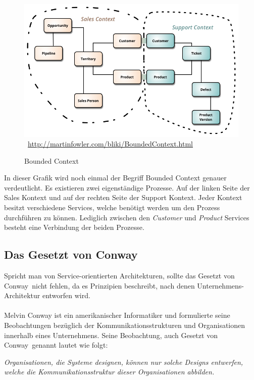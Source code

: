 \begin{figure}[htb]
    \centering 
    \includegraphics[width=\linewidth]{content/images/BoundedContext}\
    \quelle\url{http://martinfowler.com/bliki/BoundedContext.html}
    \caption[Bounded Context]{Bounded Context\\}
    \label{fig:BoundedContext}  
\end{figure} 
In dieser Grafik wird noch einmal der Begriff Bounded Context genauer verdeutlicht. Es existieren zwei eigenständige Prozesse. Auf der linken Seite der Sales Kontext und auf der rechten Seite der Support Kontext. Jeder Kontext besitzt verschiedene Services, welche benötigt werden um den Prozess durchführen zu können. Lediglich zwischen den \textit{Customer} und \textit{Product} Services besteht eine Verbindung der beiden Prozesse.

\subsection{Das Gesetzt von Conway}
\label{subsec:conway}
Spricht man von Service-orientierten Architekturen, sollte das \glqq Gesetzt von Conway\grqq\ nicht fehlen, da es Prinzipien beschreibt, nach denen Unternehmens-Architektur entworfen wird.
\\\\
Melvin Conway ist ein amerikanischer Informatiker und formulierte seine Beobachtungen bezüglich der Kommunikationsstrukturen und Organisationen innerhalb eines Unternehmens. Seine Beobachtung, auch \glqq Gesetzt von Conway\grqq\ genannt lautet wie folgt:
\begin{center}
    \textit{Organisationen, die Systeme designen, können nur solche Designs entwerfen, welche die Kommunikationsstruktur dieser Organisationen abbilden.}
\end{center}

